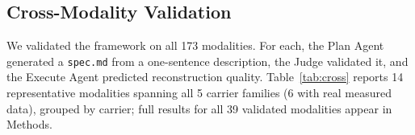 \documentclass[11pt,a4paper]{article}
\begin{document}
\subsection{Cross-Modality Validation}
\label{sec:cross}

We validated the framework on all 173 modalities.  For each, the Plan Agent generated a \texttt{spec.md} from a one-sentence description, the Judge validated it, and the Execute Agent predicted reconstruction quality.  Table~\ref{tab:cross} reports 14 representative modalities spanning all 5 carrier families (6 with real measured data), grouped by carrier; full results for all 39 validated modalities appear in Methods.
\end{document}
